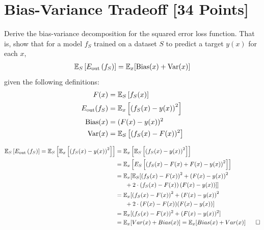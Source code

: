 
\newpage
\section{Bias-Variance Tradeoff [34 Points]}

\begin{problem}[5]
  Derive the bias-variance decomposition for the squared error loss function. That is, show that for a model $f_S$ trained on a dataset $S$ to predict a target $y(x)$ for each $x$,
  \begin{align*}
    \mathbb{E}_S \left[E_\text{out}\left(f_S\right)\right] = \mathbb{E}_x[\operatorname{Bias}(x) + \operatorname{Var}(x)]
  \end{align*}
  given the following definitions:
  \begin{align*}
    F(x) &= \mathbb{E}_S\left[f_S(x) \right] \\
    E_\text{out}(f_S) &= \mathbb{E}_x\left[\left(f_S(x) - y(x)\right)^2\right] \\
    \operatorname{Bias}(x) &= (F(x) - y(x))^2 \\
    \operatorname{Var}(x) &= \mathbb{E}_S\left[(f_S(x)-F(x))^2\right]
  \end{align*}
\end{problem}

\begin{solution}
  \begin{align*}
    \E_S\left[E_\text{out}\left(f_S\right)\right] = \E_S\left[\E_x\left[\left(f_S(x) - y(x)\right)^2\right]\right] &= \E_x\left[\E_S\left[\left(f_S(x) - y(x)\right)^2\right]\right] \\
    &= \E_x\left[E_S\left[\left(f_S(x) - F(x) + F(x) - y(x)\right)^2\right]\right] \\
    &= \E_x[\E_S[\left(f_S(x) - F(x)\right)^2 + \left(F(x) - y(x)\right)^2
     \\ & \ \ \ \ \ + 2 \cdot \left(f_S(x) - F(x)\right)\left(F(x) - y(x)\right)]] \\
    &= \E_x[\left(f_S(x) - F(x)\right)^2 + \left(F(x) - y(x)\right)^2
     \\ & \ \ \ \ \ + 2 \cdot (F(x) - F(x))(F(x) - y(x))] \\
    &= \E_x[(f_S(x) - F(x))^2 + (F(x) - y(x))^2] \\
    &= \E_x[Var(x) + Bias(x)] = \E_x[Bias(x) + Var(x)] \ \ \ \ \ \square
  \end{align*}
\end{solution}

